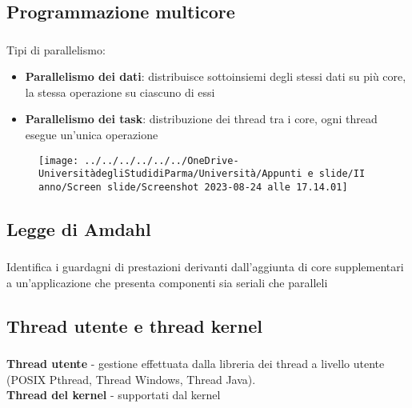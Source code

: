 \documentclass{beamer}
\newenvironment{mainframe}{
	\begin{frame}
		\frametitle{\insertsubsection}
		\framesubtitle{\insertsection}
	}{
	\end{frame}
}
\begin{document}
\subsection{Programmazione multicore}
\begin{mainframe}
	Tipi di parallelismo:
	\begin{itemize}
		\item \textbf{Parallelismo dei dati}: distribuisce sottoinsiemi degli stessi dati su più core, la stessa operazione su ciascuno di essi
		\item \textbf{Parallelismo dei task}: distribuzione dei thread tra i core, ogni thread esegue un'unica operazione
	\end{itemize}
	\begin{figure}
		\centering
		\texttt{[image: ../../../../../../OneDrive-UniversitàdegliStudidiParma/Università/Appunti e slide/II anno/Screen slide/Screenshot 2023-08-24 alle 17.14.01]}
	\end{figure}
\end{mainframe}
\subsection{Legge di Amdahl}
\begin{mainframe}
	Identifica i guardagni di prestazioni derivanti dall'aggiunta di core supplementari a un'applicazione che presenta componenti sia seriali che paralleli
\end{mainframe}
\subsection{Thread utente e thread kernel}
\begin{mainframe}
	\textbf{Thread utente} - gestione effettuata dalla libreria dei thread a livello utente (POSIX Pthread, Thread Windows, Thread Java).\\
	\textbf{Thread del kernel} - supportati dal kernel
\end{mainframe}
\end{document}
